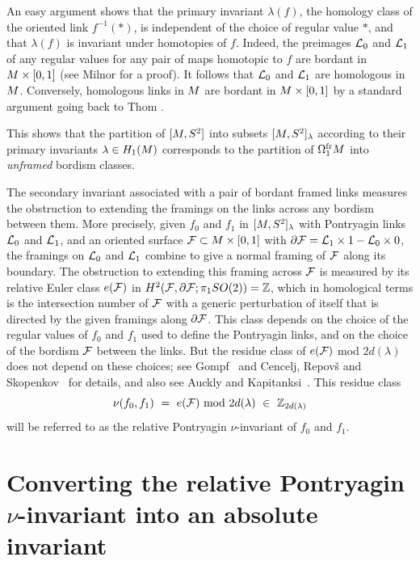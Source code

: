 An easy argument shows that the primary invariant $\lambda(f)$, the homology class of the oriented link $f^{-1}(*)$, is independent of the choice of regular value $*$, and that $\lambda(f)$ is invariant under homotopies of $f$.  Indeed, the preimages $\mathcal L_0$ and $\mathcal L_1$ of any regular values for any pair of maps homotopic to $f$ are bordant in $M\times[0,1]$ (see Milnor \cite{Milnor65} for a proof).  It follows that $\mathcal L_0$ and $\mathcal L_1$ are homologous in $M$.  Conversely, homologous links in $M$ are bordant in $M\times[0,1]$ by a standard argument going back to Thom \cite{Thom}.   

This shows that the partition of $[M,S^2]$ into subsets $[M,S^2]_\lambda$ according to their primary invariants $\lambda\in H_1(M)$ corresponds to the partition of $\Omega_1^{\text{fr}}M$ into {\it unframed} bordism classes.  


The secondary invariant associated with a pair of bordant framed links measures the obstruction to extending the framings on the links across any bordism between them.    More precisely, given $f_0$ and $f_1$ in $[M,S^2]_\lambda$ with Pontryagin links $\mathcal L_0$ and $\mathcal L_1$, and an oriented surface 
$\mathcal F \subset M\times[0,1]$ with $\partial\mathcal F  =  \mathcal L_1\times1 - \mathcal L_0\times0$,  the framings on $\mathcal L_0$ and  $\mathcal L_1$ combine to give a normal framing of $\mathcal F$ along its boundary.  The obstruction to extending this framing across $\mathcal F$ is measured by its relative Euler class $e(\mathcal F)$ in $H^2(\mathcal F,\partial\mathcal F;\pi_1SO(2)) = \mathbb Z$,
which in homological terms is the intersection number of $\mathcal F$ with a generic perturbation of itself that is directed by the given framings along $\partial\mathcal F$.   This class depends on the choice of the regular values of $f_0$ and $f_1$ used to define the Pontryagin links, and on the choice of the bordism $\mathcal F$ between the links.  But the residue class of $e(\mathcal F)$ mod $2d(\lambda)$ does not depend on these choices; see Gompf~\cite{Gompf} and Cencelj, Repov{\v s} and Skopenkov~\cite{Cencelj} for details, and also see Auckly and Kapitanksi~\cite{AucklyKapitanski}.  
This residue class 
$$
\nu(f_0,f_1)  \ = \ e(\mathcal F) \textup{ mod }2d(\lambda) \ \in \ \mathbb Z_{2d(\lambda)}
$$
will be referred to as the {\itb relative Pontryagin $\nu$-invariant} of $f_0$ and $f_1$. 

\part{Converting the relative Pontryagin $\nu$-invariant into an absolute invariant}

